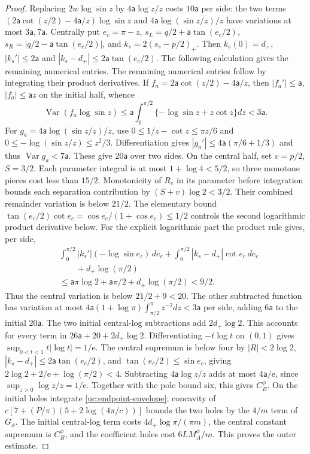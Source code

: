 \begin{proof}
Replacing $2w\log\sin z$ by $4\mathsf{a}\log z/z$ costs $10\mathsf{a}$ per side:
the two terms
$(2\mathsf{a}\cot(z/2)-4\mathsf{a}/z)\log\sin z$ and
$4\mathsf{a}\log(\sin z/z)/z$ have variations at most $3\mathsf{a},7\mathsf{a}$.
Centrally put $e_c=\pi-z$, $s_L=q/2+\mathsf a\tan(e_c/2)$,
$s_R=|q/2-\mathsf a\tan(e_c/2)|$, and $k_s=2(s_s-p/2)_+$.
Then $k_s(0)=d_+$, $|k_s'|\leq2\mathsf a$ and
$|k_s-d_+|\leq2\mathsf a\tan(e_c/2)$.
The following calculation gives the remaining numerical entries.
The remaining numerical entries follow by integrating their
product derivatives. If $f_a=2\mathsf{a}\cot(z/2)-4\mathsf{a}/z$, then
$|f_a'|\leq \mathsf{a}$, $|f_a|\leq \mathsf{a}z$ on the initial half, whence
\[
 \operatorname{Var}(f_a\log\sin z)
 \leq \mathsf{a}\int_0^{\pi/2}\{-\log\sin z+z\cot z\}dz<3\mathsf{a}.
\]
For $g_a=4\mathsf{a}\log(\sin z/z)/z$, use
$0\leq1/z-\cot z\leq\pi z/6$ and
$0\leq-\log(\sin z/z)\leq z^2/3$. Differentiation gives
$|g_a'|\leq4\mathsf{a}(\pi/6+1/3)$ and thus
$\operatorname{Var}g_a<7\mathsf{a}$. These give $20\mathsf{a}$ over two sides.
On the central half, set $v=p/2$, $S=3/2$. Each parameter integral
is at most $1+\log4<5/2$, so three monotone pieces cost less than
$15/2$. Monotonicity of $R_e$ in its parameter before integration
bounds each separation contribution by $(S+v)\log2<3/2$.
Their combined remainder variation is below $21/2$.
The elementary bound
$\tan(e_c/2)\cot e_c=\cos e_c/(1+\cos e_c)\leq1/2$
controls the second logarithmic product derivative below.
For the explicit logarithmic part the product rule gives, per side,
\[
 \begin{aligned}
 &\int_0^{\pi/2}|k_s'|(-\log\sin e_c)\,de_c
 +\int_0^{\pi/2}|k_s-d_+|\cot e_c\,de_c\\
 &\qquad +d_+\log(\pi/2)\\
 &\leq \mathsf{a}\pi\log2+\mathsf{a}\pi/2+d_+\log(\pi/2)<9/2.
 \end{aligned}
\]
Thus the central variation is below $21/2+9<20$. The other
subtracted function has variation at most
$4\mathsf{a}(1+\log\pi)\int_{\pi/2}^{\pi}z^{-2}dz<3\mathsf{a}$ per side,
adding $6\mathsf{a}$ to the initial $20\mathsf{a}$. The two initial central-log
subtractions add $2d_+\log2$. This accounts for every term in
$26\mathsf{a}+20+2d_+\log2$.
Differentiating $-t\log t$ on $(0,1)$ gives
$\sup_{0<t<1}t|\log t|=1/\mathrm e$.
The central supremum is below four by $|R|<2\log2$, $|k_s-d_+|\leq2\mathsf a\tan(e_c/2)$, and $\tan(e_c/2)\leq\sin e_c$, giving $2\log2+2/\mathrm e+\log(\pi/2)<4$. Subtracting
$4\mathsf{a}\log z/z$ adds at most $4\mathsf{a}/\mathrm e$, since
$\sup_{z>0}\log z/z=1/\mathrm e$. Together with the pole bound
six, this gives $C_B^\phi$. On the initial holes integrate
\eqref{uc:endpoint-envelope}; concavity of
$c[7+(P/\pi)(5+2\log(4\pi/c))]$ bounds the two holes by the
$4/m$ term of $G_\phi$. The initial central-log term costs
$4d_+\log\pi/(\pi m)$, the central constant supremum is $C_B^\phi$,
and the coefficient holes cost $6LM_A^\phi/m$. This proves the
outer estimate.


\end{proof}
